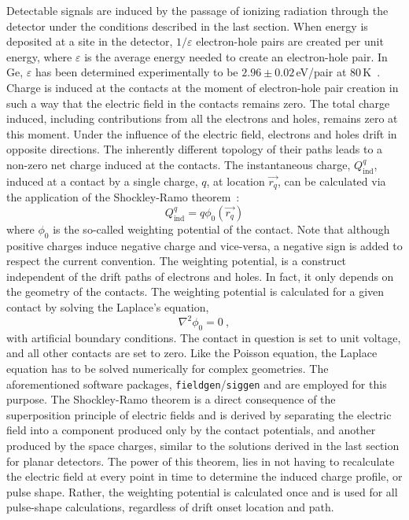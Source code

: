 Detectable signals are induced by the passage of ionizing radiation through the detector under the conditions described in the last section. When energy is deposited at a site in the detector, $1/\varepsilon$ electron-hole pairs are created per unit energy, where $\varepsilon$ is the average energy needed to create an electron-hole pair. In Ge, $\varepsilon$ has been determined experimentally to be $2.96\pm0.02$\,eV/pair at 80\,K~\cite{energy_pair}. Charge is induced at the contacts at the moment of electron-hole pair creation in such a way that the electric field in the contacts remains zero. The total charge induced, including contributions from all the electrons and holes, remains zero at this moment. Under the influence of the electric field, electrons and holes drift in opposite directions. The inherently different topology of their paths leads to a non-zero net charge induced at the contacts. The instantaneous charge, $Q^q_\text{ind}$, induced at a contact by a single charge, $q$, at location $\vec{r_q}$, can be calculated via the application of the Shockley-Ramo theorem~\cite{shockley,ramo}: 
\begin{equation}
	Q^q_\text{ind} = q\phi_0(\vec{r_q})
	\label{eq:charge_ind}
\end{equation}
where $\phi_0$ is the so-called weighting potential of the contact. Note that although positive charges induce negative charge and vice-versa, a negative sign is added to respect the current convention. The weighting potential, is a construct independent of the drift paths of electrons and holes. In fact, it only depends on the geometry of the contacts. The weighting potential is calculated for a given contact by solving the Laplace's equation,
 \begin{equation}
	\nabla^2\phi_0=0~,
	\label{eq:laplace}
\end{equation}
with artificial boundary conditions. The contact in question is set to unit voltage, and all other contacts are set to zero. Like the Poisson equation, the Laplace equation has to be solved numerically for complex geometries. The aforementioned software packages, \texttt{fieldgen}/\texttt{siggen} and \SSD{} are employed for this purpose. The Shockley-Ramo theorem is a direct consequence of the superposition principle of electric fields and is derived by separating the electric field into a component produced only by the contact potentials, and another produced by the space charges, similar to the solutions derived in the last section for planar detectors. The power of this theorem, lies in not having to recalculate the electric field at every point in time to determine the induced charge profile, or pulse shape. Rather, the weighting potential is calculated once and is used for all pulse-shape calculations, regardless of drift onset location and path. 

